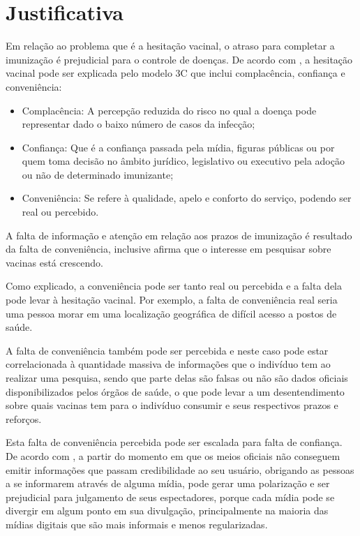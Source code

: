 

\section{Justificativa}

Em relação ao problema que é a hesitação vacinal, o atraso para completar a imunização é prejudicial para o controle de doenças. De acordo com \cite{gianfredi_countering_2019}, a hesitação vacinal pode ser explicada pelo modelo 3C que inclui complacência, confiança e conveniência:
\begin{itemize}
    \item Complacência: A percepção reduzida do risco no qual a doença pode representar dado o baixo número de casos da infecção;
    \item Confiança: Que é a confiança passada pela mídia, figuras públicas ou por quem toma decisão no âmbito jurídico, legislativo ou executivo pela adoção ou não de determinado imunizante;
    \item Conveniência: Se refere à qualidade, apelo e conforto do serviço, podendo ser real ou percebido.
\end{itemize}

A falta de informação e atenção em relação aos prazos de imunização é resultado da falta de conveniência, inclusive \cite{bragazzi_how_2017} afirma que o interesse em pesquisar sobre vacinas está crescendo.

Como explicado, a conveniência pode ser tanto real ou percebida e a falta dela pode levar à hesitação vacinal. Por exemplo, a falta de conveniência real seria uma pessoa morar em uma  localização geográfica de difícil acesso a postos de saúde.

A falta de conveniência também pode ser percebida e neste caso pode estar correlacionada à quantidade massiva de informações que o indivíduo tem ao realizar uma pesquisa, sendo que parte delas são falsas ou não são dados oficiais disponibilizados pelos órgãos de saúde, o que pode levar a um desentendimento sobre quais vacinas tem para o indivíduo consumir e seus respectivos prazos e reforços.

Esta falta de conveniência percebida pode ser escalada para falta de confiança. De acordo com \cite{puri_social_2020}, a partir do momento em que os meios oficiais não conseguem emitir informações que passam credibilidade ao seu usuário, obrigando as pessoas a se informarem através de alguma mídia, pode gerar uma polarização e ser prejudicial para julgamento de seus espectadores, porque cada mídia pode se divergir em algum ponto em sua divulgação, principalmente na maioria das mídias digitais que são mais informais e menos regularizadas.

